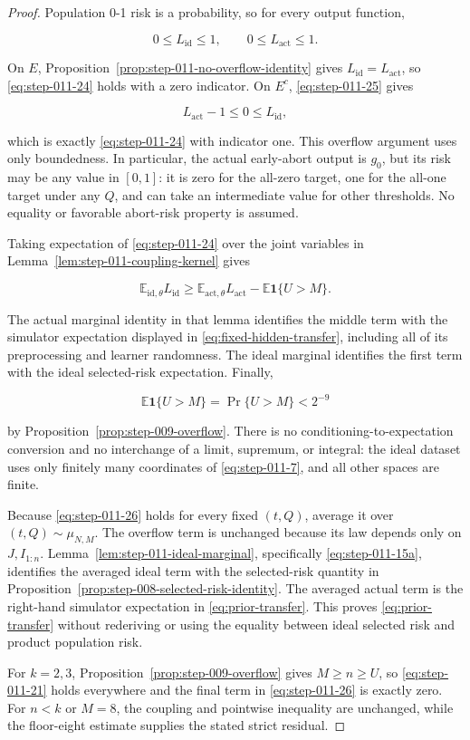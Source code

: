 \begin{proof}
Population 0-1 risk is a probability, so for every output function,

\[
  0\le L_{\mathrm{id}}\le1,
  \qquad
  0\le L_{\mathrm{act}}\le1.
\tag{S11.25}\label{eq:step-011-25}
\]

On \(E\), Proposition~\ref{prop:step-011-no-overflow-identity} gives
\(L_{\mathrm{id}}=L_{\mathrm{act}}\), so \eqref{eq:step-011-24} holds with a zero
indicator. On \(E^c\), \eqref{eq:step-011-25} gives

\[
  L_{\mathrm{act}}-1\le0\le L_{\mathrm{id}},
\]

which is exactly \eqref{eq:step-011-24} with indicator one. This overflow argument uses only
boundedness. In particular, the actual early-abort output is \(g_0\), but
its risk may be any value in \([0,1]\): it is zero for the all-zero target,
one for the all-one target under any \(Q\), and can take an intermediate
value for other thresholds. No equality or favorable abort-risk property
is assumed.

Taking expectation of \eqref{eq:step-011-24} over the joint variables in
Lemma~\ref{lem:step-011-coupling-kernel} gives

\[
  \mathbb E_{\mathrm{id},\theta}L_{\mathrm{id}}
  \ge
  \mathbb E_{\mathrm{act},\theta}L_{\mathrm{act}}
  -\mathbb E\mathbf1\{U>M\}.
\tag{S11.26}\label{eq:step-011-26}
\]

The actual marginal identity in that lemma identifies the middle term with
the simulator expectation displayed in \eqref{eq:fixed-hidden-transfer}, including all of its
preprocessing and learner randomness. The ideal marginal identifies the
first term with the ideal selected-risk expectation. Finally,

\[
  \mathbb E\mathbf1\{U>M\}=\Pr\{U>M\}<2^{-9}
\tag{S11.27}\label{eq:step-011-27}
\]

by Proposition~\ref{prop:step-009-overflow}. There is no conditioning-to-expectation
conversion and no interchange of a limit, supremum, or integral: the
ideal dataset uses only finitely many coordinates of \eqref{eq:step-011-7}, and all other
spaces are finite.

Because \eqref{eq:step-011-26} holds for every fixed \((t,Q)\), average it over
\((t,Q)\sim\mu_{N,M}\). The overflow term is unchanged because its law
depends only on \(J,I_{1:n}\). Lemma~\ref{lem:step-011-ideal-marginal},
specifically \eqref{eq:step-011-15a}, identifies the averaged ideal term
with the selected-risk quantity in
Proposition~\ref{prop:step-008-selected-risk-identity}. The averaged
actual term is
the right-hand simulator expectation in \eqref{eq:prior-transfer}. This proves \eqref{eq:prior-transfer} without
rederiving or using the equality between ideal selected risk and
product population risk.

For \(k=2,3\), Proposition~\ref{prop:step-009-overflow} gives
\(M\ge n\ge U\), so \eqref{eq:step-011-21} holds everywhere and the final term in \eqref{eq:step-011-26} is
exactly zero. For \(n<k\) or \(M=8\), the coupling and pointwise inequality
are unchanged, while the floor-eight estimate supplies the stated
strict residual. \end{proof}
